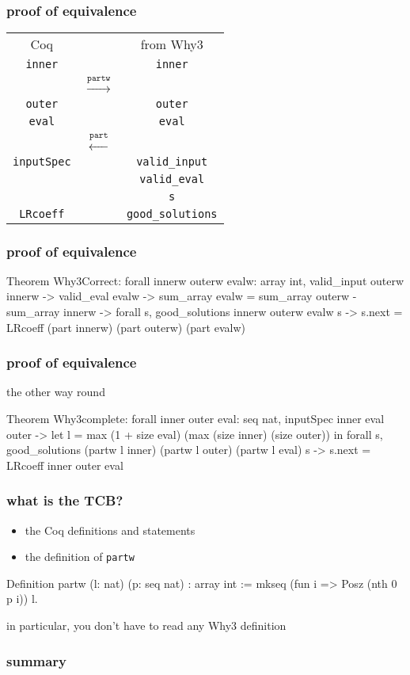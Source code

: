 \documentclass{beamer}
\let\emph\alert
\begin{document}
\begin{frame}\frametitle{proof of equivalence}
  \begin{center}
    \begin{tabular}{ccc}
      \emph{Coq} & & \emph{from Why3} \\[1em]
      \texttt{inner} & &       \texttt{inner} \\[-1em]
      & $\stackrel{\mathtt{partw}}{\longrightarrow}$
      & \\[-0.5em]
      \texttt{outer} & &\texttt{outer} \\
      \texttt{eval} & &       \texttt{eval} \\[-1.5em]
      & $\stackrel{\mathtt{part}}{\longleftarrow}$ & \\[1em]
      \texttt{inputSpec} & & \texttt{valid\_input} \\
                         & & \texttt{valid\_eval} \\
                         & & \texttt{s} \\
      \texttt{LRcoeff}   & & \texttt{good\_solutions}
    \end{tabular}
  \end{center}
\end{frame}

\begin{frame}[fragile]\frametitle{proof of equivalence}
\begin{coq}
Theorem Why3Correct:
  forall innerw outerw evalw: array int,
  valid_input outerw innerw ->
  valid_eval evalw ->
  sum_array evalw =
    sum_array outerw - sum_array innerw ->
  forall s, good_solutions innerw outerw evalw s ->
  s.next =
    LRcoeff (part innerw) (part outerw) (part evalw)
\end{coq}
\end{frame}

\begin{frame}[fragile]\frametitle{proof of equivalence}
the other way round
\bigskip
\begin{coq}
Theorem Why3complete:
  forall inner outer eval: seq nat,
  inputSpec inner eval outer ->
  let l = max (1 + size eval)
              (max (size inner) (size outer)) in
  forall s,
  good_solutions (partw l inner)
                 (partw l outer) (partw l eval) s ->
  s.next = LRcoeff inner outer eval
\end{coq}
\end{frame}

\begin{frame}[fragile]\frametitle{what is the TCB?}
  \begin{itemize}
  \item the Coq definitions and statements
  \item the definition of \texttt{partw}
  \end{itemize}
\begin{coq}
Definition partw (l: nat) (p: seq nat) : array int :=
  mkseq (fun i => Posz (nth 0 p i)) l.
\end{coq}

  \bigskip
  in particular, you don't have to read \emph{any} Why3 definition
\end{frame}

\begin{frame}\frametitle{summary}

\end{frame}
\end{document}
